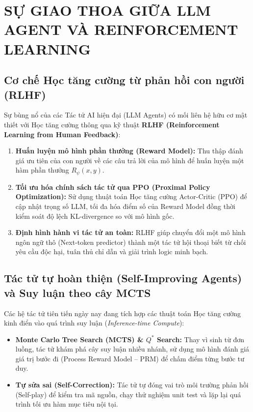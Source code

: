 \documentclass[12pt,a4paper]{article}
\begin{document}
\clearpage


\section{SỰ GIAO THOA GIỮA LLM AGENT VÀ REINFORCEMENT LEARNING}

\subsection{Cơ chế Học tăng cường từ phản hồi con người (RLHF)}
Sự bùng nổ của các Tác tử AI hiện đại (LLM Agents) có mối liên hệ hữu cơ mật thiết với Học tăng cường thông qua kỹ thuật \textbf{RLHF (Reinforcement Learning from Human Feedback)}:
\begin{enumerate}
    \item \textbf{Huấn luyện mô hình phần thưởng (Reward Model):} Thu thập đánh giá ưu tiên của con người về các câu trả lời của mô hình để huấn luyện một hàm phần thưởng $R_\psi(x, y)$.
    \item \textbf{Tối ưu hóa chính sách tác tử qua PPO (Proximal Policy Optimization):} Sử dụng thuật toán Học tăng cường Actor-Critic (PPO) để cập nhật trọng số LLM, tối đa hóa điểm số của Reward Model đồng thời kiểm soát độ lệch KL-divergence so với mô hình gốc.
    \item \textbf{Định hình hành vi tác tử an toàn:} RLHF giúp chuyển đổi một mô hình ngôn ngữ thô (Next-token predictor) thành một tác tử hội thoại biết từ chối yêu cầu độc hại, tuân thủ chỉ dẫn và giải trình logic minh bạch.
\end{enumerate}

\subsection{Tác tử tự hoàn thiện (Self-Improving Agents) và Suy luận theo cây MCTS}
Các hệ tác tử tiên tiến ngày nay đang tích hợp các thuật toán Học tăng cường kinh điển vào quá trình suy luận (\textit{Inference-time Compute}):
\begin{itemize}
    \item \textbf{Monte Carlo Tree Search (MCTS) \& $Q^*$ Search:} Thay vì sinh từ đơn luồng, tác tử khám phá cây suy luận nhiều nhánh, sử dụng mô hình đánh giá giá trị bước đi (Process Reward Model -- PRM) để chấm điểm từng bước tư duy.
    \item \textbf{Tự sửa sai (Self-Correction):} Tác tử tự đóng vai trò môi trường phản hồi (Self-play) để kiểm tra mã nguồn, chạy thử nghiệm unit test và lặp lại quá trình tối ưu hàm mục tiêu nội tại.
\end{itemize}
\end{document}
